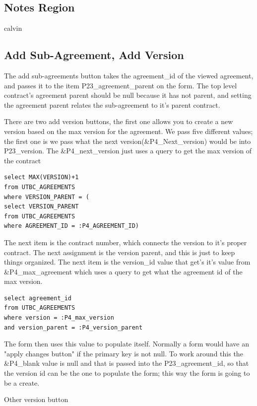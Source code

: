 \documentclass{report}
\begin{document}
\subsection{Notes Region}
calvin

\subsection{Add Sub-Agreement, Add Version}
The add sub-agreements button takes the agreement\_id of the viewed agreement, and passes it to the item P23\_agreement\_parent on the form. The top level contract's agreement parent should be null because it has not parent, and setting the agreement parent relates the sub-agreement to it's parent contract.

There are two add version buttons, the first one allows you to create a new version based on the max version for the agreement. We pass five different values; the first one is we pass what the next version(\&P4\_Next\_version) would be into P23\_version. The \&P4\_next\_version just uses a query to get the max version of the contract

\begin{lstlisting}[caption=P4\_NEXT\_value query]
select MAX(VERSION)+1 
from UTBC_AGREEMENTS 
where VERSION_PARENT = (
select VERSION_PARENT 
from UTBC_AGREEMENTS 
where AGREEMENT_ID = :P4_AGREEMENT_ID)
\end{lstlisting}

The next item is the contract number, which connects the version to it's proper contract. The next assignment is the version parent, and this is just to keep things organized. The next item is the version\_id value that get's it's value from \&P4\_max\_agreement which uses a query to get what the agreement id of the max version. 

\begin{lstlisting}[caption=P4\_max\_agreement query]
select agreement_id 
from UTBC_AGREEMENTS 
where version = :P4_max_version 
and version_parent = :P4_version_parent
\end{lstlisting}

The form then uses this value to populate itself. Normally a form would have an "apply changes button" if the primary key is not null. To work around this the \&P4\_blank value is null and that is passed into the P23\_agreement\_id, so that the version id can be the one to populate the form; this way the form is going to be a create. 

Other version button
\end{document}
